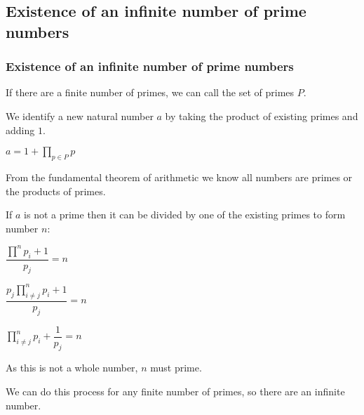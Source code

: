 
\subsection{Existence of an infinite number of prime numbers}

\subsubsection{Existence of an infinite number of prime numbers}

If there are a finite number of primes, we can call the set of primes \(P\).

We identify a new natural number \(a\) by taking the product of existing primes and adding \(1\).

\(a=1+\prod_{p\in P} p\)

From the fundamental theorem of arithmetic we know all numbers are primes or the products of primes.

If \(a\) is not a prime then it can be divided by one of the existing primes to form number \(n\):

\(\dfrac{\prod^n p_i +1}{p_j}=n\)

\(\dfrac{p_j \prod^n_{i\ne j} p_i +1}{p_j}=n\)

\(\prod^n_{i\ne j} p_i +\dfrac{1}{p_j}=n\)

As this is not a whole number, \(n\) must prime.

We can do this process for any finite number of primes, so there are an infinite number.

